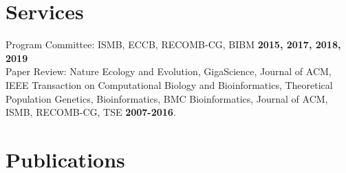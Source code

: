 \documentclass[margin,line,letterpaper]{resume}
\begin{document}
\begin{resume}
\begin{small}
  \vspace{-2mm}
   \section{\mysidestyle Services}
    Program Committee: ISMB, ECCB, RECOMB-CG, BIBM  \hfill \textbf{2015, 2017, 2018, 2019}\vspace{1mm}\\
    Paper Review:  Nature Ecology and Evolution, GigaScience, Journal of ACM, IEEE Transaction on Computational Biology and Bioinformatics, Theoretical Population Genetics, Bioinformatics, BMC Bioinformatics, Journal of ACM, ISMB, RECOMB-CG, TSE   \hfill \textbf{2007-2016}. %

    \renewcommand*{\thefootnote}{\fnsymbol{footnote}}
    \section{\mysidestyle Publications}

\newcommand\blfootnote[1]{%
  \begingroup
  \renewcommand\thefootnote{}\footnote{#1}%
  \addtocounter{footnote}{-1}%
  \endgroup
}
    

\begin{footnotesize}
\vspace{-10pt}
\begin{spacing}{-1}

\end{spacing}
\end{footnotesize}


\end{small}
\end{resume}
\end{document}
